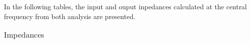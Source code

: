 In the following tables, the input and ouput inpedances  calculated at the central frequency from both analysis are presented.\\
\FloatBarrier
\begin{table}[h]
  \centering
  \begin{tabular}{|c|c|c|}
    \hline    
    
    
    
    \hline
  \end{tabular}
  \caption{Impedances}
\end{table}
\FloatBarrier   



